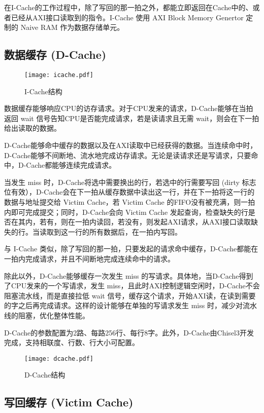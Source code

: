 在I-Cache的工作过程中，除了写回的那一拍之外，都能立即返回在Cache中的、或者已经从AXI接口读取到的指令。I-Cache 使用 AXI Block Memory Genertor 定制的 Naive RAM 作为数据存储单元。

\subsection{数据缓存 (D-Cache)}

\begin{figure}[htbp]
	\centering
	\texttt{[image: icache.pdf]}
	\caption{I-Cache结构}
	\label{fig:dcache}
\end{figure}

数据缓存能够响应CPU的访存请求。对于CPU发来的请求，D-Cache能够在当拍返回 wait 信号告知CPU是否能完成请求，若是读请求且无需 wait，则会在下一拍给出读取的数据。

D-Cache能够命中缓存的数据以及在AXI读取中已经获得的数据。当连续命中时，D-Cache能够不间断地、流水地完成访存请求。无论是读请求还是写请求，只要命中，D-Cache都能够连续完成请求。

当发生 miss 时，D-Cache将选中需要换出的行，若选中的行需要写回 (dirty 标志位有效），D-Cache会在下一拍从缓存数据中读出这一行，并在下一拍将这一行的数据与地址提交给 Victim Cache，若 Victim Cache 的FIFO没有被充满，则一拍内即可完成提交；同时，D-Cache会向 Victim Cache 发起查询，检查缺失的行是否在其内，若有，则在一拍内读回，若没有，则发起AXI请求，从AXI接口读取缺失的行。当读取到这一行的所有数据后，在一拍内写回。

与 I-Cache 类似，除了写回的那一拍，只要发起的请求命中缓存，D-Cache都能在一拍内完成请求，并且不间断地完成连续命中的请求。

除此以外，D-Cache能够缓存一次发生 miss 的写请求。具体地，当D-Cache得到了CPU发来的一个写请求，发生 miss，且此时AXI控制逻辑空闲时，D-Cache不会阻塞流水线，而是直接拉低 wait 信号，缓存这个请求，开始AXI读，在读到需要的字之后再完成请求。这样的设计能够在单独的写请求发生 miss 时，减少对流水线的阻塞，优化整体性能。

D-Cache的参数配置为2路、每路256行、每行8字。此外，D-Cache由Chisel3开发完成，支持相联度、行数、行大小可配置。

\begin{figure}[htbp]
	\centering
	\texttt{[image: dcache.pdf]}
	\caption{D-Cache结构}
	\label{fig:dcache}
\end{figure}

\subsection{写回缓存 (Victim Cache)}

